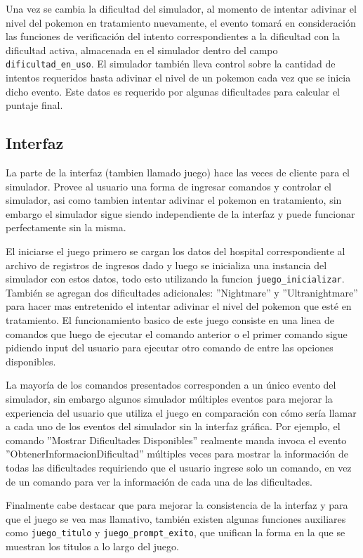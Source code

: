 \documentclass[titlepage,a4paper]{article}
\begin{document}
Una vez se cambia la dificultad del simulador, al momento de intentar adivinar
el nivel del pokemon en tratamiento nuevamente, el evento tomará en
consideración las funciones de verificación del intento correspondientes a la
dificultad con la dificultad activa, almacenada en el simulador dentro del campo
\lstinline{dificultad_en_uso}. El simulador también lleva control sobre la
cantidad de intentos requeridos hasta adivinar el nivel de un pokemon cada vez
que se inicia dicho evento. Este datos es requerido por algunas dificultades
para calcular el puntaje final.

\subsection{Interfaz}

La parte de la interfaz (tambien llamado juego) hace las veces de cliente para
el simulador. Provee al usuario una forma de ingresar comandos y controlar el
simulador, asi como tambien intentar adivinar el pokemon en tratamiento, sin
embargo el simulador sigue siendo independiente de la interfaz y puede funcionar
perfectamente sin la misma.

El iniciarse el juego primero se cargan los datos del hospital correspondiente
al archivo de registros de ingresos dado y luego se inicializa una instancia del
simulador con estos datos, todo esto utilizando la funcion
\lstinline{juego_inicializar}. También se agregan dos dificultades adicionales: 
''Nightmare'' y ''Ultranightmare'' para hacer mas entretenido el intentar
adivinar el nivel del pokemon que esté en tratamiento. El funcionamiento basico
de este juego consiste en una linea de comandos que luego de ejecutar el comando
anterior o el primer comando sigue pidiendo input del usuario para ejecutar otro
comando de entre las opciones disponibles.

La mayoría de los comandos presentados corresponden a un único evento del
simulador, sin embargo algunos simulador múltiples eventos para mejorar la
experiencia del usuario que utiliza el juego en comparación con cómo sería
llamar a cada uno de los eventos del simulador sin la interfaz gráfica. Por
ejemplo, el comando ''Mostrar Dificultades Disponibles'' realmente manda invoca
el evento ''ObtenerInformacionDificultad'' múltiples veces para mostrar la
información de todas las dificultades requiriendo que el usuario ingrese solo
un comando, en vez de un comando para ver la información de cada una de las 
dificultades.

Finalmente cabe destacar que para mejorar la consistencia de la interfaz y para
que el juego se vea mas llamativo, también existen algunas funciones auxiliares
como \lstinline{juego_titulo} y \lstinline{juego_prompt_exito}, que unifican la 
forma en la que se muestran los titulos a lo largo del juego.
\end{document}
